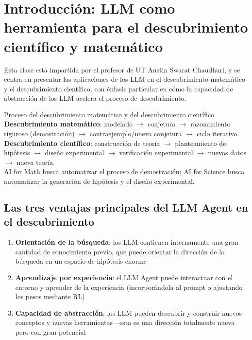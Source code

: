 \section{Introducción: LLM como herramienta para el descubrimiento científico y matemático}

Esta clase está impartida por el profesor de UT Austin Swarat Chaudhuri, y se centra en presentar las aplicaciones de los LLM en el descubrimiento matemático y el descubrimiento científico, con énfasis particular en cómo la capacidad de abstracción de los LLM acelera el proceso de descubrimiento.

\begin{knowledgebox}{Proceso del descubrimiento matemático y del descubrimiento científico}
\textbf{Descubrimiento matemático}: modelado $\to$ conjetura $\to$ razonamiento riguroso (demostración) $\to$ contraejemplo/nueva conjetura $\to$ ciclo iterativo.\\
\textbf{Descubrimiento científico}: construcción de teoría $\to$ planteamiento de hipótesis $\to$ diseño experimental $\to$ verificación experimental $\to$ nuevos datos $\to$ nueva teoría.\\
AI for Math busca automatizar el proceso de demostración; AI for Science busca automatizar la generación de hipótesis y el diseño experimental.
\end{knowledgebox}

\subsection{Las tres ventajas principales del LLM Agent en el descubrimiento}

\begin{enumerate}
    \item \textbf{Orientación de la búsqueda}: los LLM contienen internamente una gran cantidad de conocimiento previo, que puede orientar la dirección de la búsqueda en un espacio de hipótesis enorme
    \item \textbf{Aprendizaje por experiencia}: el LLM Agent puede interactuar con el entorno y aprender de la experiencia (incorporándola al prompt o ajustando los pesos mediante RL)
    \item \textbf{Capacidad de abstracción}: los LLM pueden descubrir y construir nuevos conceptos y nuevas herramientas—esta es una dirección totalmente nueva pero con gran potencial
\end{enumerate}
